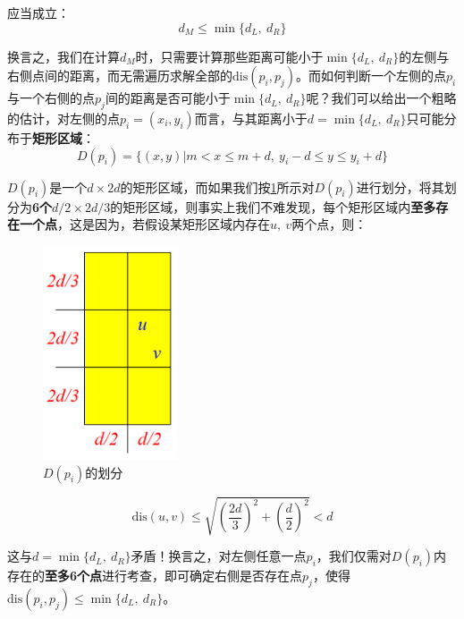 \documentclass[12pt,a4paper,violet,oneside]{bbe}
\begin{document}
应当成立：
$$
d_M\leqslant \min\{d_L,~d_R\}
$$

换言之，我们在计算$d_M$时，只需要计算那些距离可能小于$\min\{d_L,~d_R\}$的左侧与右侧点间的距离，而无需遍历求解全部的$\text{dis}(p_i,p_j)$。而如何判断一个左侧的点$p_i$与一个右侧的点$p_j$间的距离是否可能小于$\min\{d_L,~d_R\}$呢？我们可以给出一个粗略的估计，对左侧的点$p_i=(x_i,y_i)$而言，与其距离小于$d=\min\{d_L,~d_R\}$只可能分布于\textbf{矩形区域}：
$$
D(p_i)=\{(x,y)|m<x\leqslant m+d,~y_i-d\leqslant y\leqslant y_i+d\}
$$

$D(p_i)$是一个$d\times 2d$的矩形区域，而如果我们按\cref{fig1}所示对$D(p_i)$进行划分，将其划分为\textbf{6个}$d/2\times 2d/3$的矩形区域，则事实上我们不难发现，每个矩形区域内\textbf{至多存在一个点}，这是因为，若假设某矩形区域内存在$u,~v$两个点，则：
\begin{figure}[!htbp]
	\centering
	\includegraphics[width=4cm]{fig1}
	\caption{$D(p_i)$的划分}
	\label{fig1}
\end{figure}
$$
\text{dis}(u,v)\leqslant\sqrt{\left(\frac{2d}{3}\right)^2+\left(\frac{d}{2}\right)^2}<d
$$

这与$d=\min\{d_L,~d_R\}$矛盾！换言之，对左侧任意一点$p_i$，我们仅需对$D(p_i)$内存在的\textbf{至多6个点}进行考查，即可确定右侧是否存在点$p_j$，使得$\text{dis}(p_i,p_j)\leqslant \min\{d_L,~d_R\}$。
\end{document}
